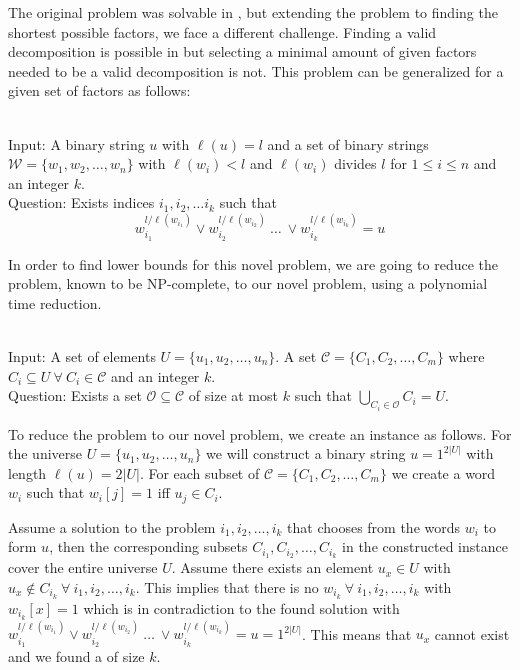 The original problem was solvable in \LogSpace, but extending the problem to finding the shortest possible factors, we face a different challenge.
Finding a valid decomposition is possible in \LogSpace but selecting a minimal amount of given factors needed to be a valid decomposition is not.
This problem can be generalized for a given set of factors as follows:
\begin{defn}{\ \\}
	Input: A binary string $u$ with $\ell(u)= l$ and a set of binary strings $\mathcal{W} = \{w_1, w_2, \dots, w_n\}$ with $\ell(w_i) < l$ and $\ell(w_i)$ divides $l$ for $1 \leq i \leq n$ and an integer $k$.\\
	Question: Exists indices $i_1, i_2, \dots i_k$ such that
	$$w_{i_1}^{l / \ell(w_{i_1})} \lor w_{i_2}^{l / \ell(w_{i_2})} ~\dots~ \lor w_{i_k}^{l / \ell(w_{i_k})} = u $$
\end{defn}

In order to find lower bounds for this novel problem, we are going to reduce the {} problem, known to be NP-complete, to our novel {} problem, using a polynomial time reduction.

\begin{defn}{\ \\}
	Input: A set of elements $U = \{u_1, u_2, \dots , u_n\}$. A set $\mathcal{C} = \{C_1, C_2, \dots , C_m\}$ where $C_i \subseteq U ~\forall~ C_i \in \mathcal{C}$ and an integer $k$.\\
	Question: Exists a set $\mathcal{O} \subseteq \mathcal{C}$ of size  at most $k$ such that $\underset{C_i \in \mathcal{O}}{\bigcup}C_i = U$.
\end{defn}
To reduce the {} problem to our novel problem, we create an instance as follows.
For the universe $U = \{u_1, u_2, \dots, u_n\}$ we will construct a binary string $u= 1^{2|U|}$ with length $\ell(u) = 2|U|$. For each subset of $\mathcal{C} = \{C_1, C_2, \dots, C_m\}$ we create a word $w_i$ such that $w_i[j] = 1$ iff $u_j \in C_i$. 

Assume a solution to the {} problem $i_1, i_2, \dots, i_k$ that chooses from the words $w_i$ to form $u$, then the corresponding subsets $C_{i_1}, C_{i_2}, \dots, C_{i_k}$ in the constructed {} instance cover the entire universe $U$.
Assume there exists an element $u_x \in U$ with $u_x \not \in C_{i_k} ~\forall~ i_1, i_2, \dots, i_k$.
This implies that there is no $w_{i_k} ~\forall~ i_1, i_2, \dots, i_k$ with $w_{i_k}[x]=1$ which is in contradiction to the found solution with $w_{i_1}^{l / \ell(w_{i_1})} \lor w_{i_2}^{l / \ell(w_{i_2})} ~\dots~ \lor w_{i_k}^{l / \ell(w_{i_k})} = u = 1^{2|U|}$.
This means that $u_x$ cannot exist and we found a {} of size $k$.

